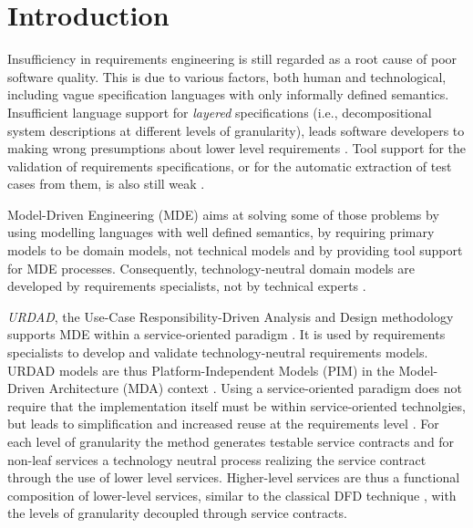 \section{Introduction}
Insufficiency in requirements engineering is still regarded as a root cause of poor software quality. This is due to various factors, both human and technological, including vague specification languages with only informally defined semantics. Insufficient language support for \emph{layered} specifications (i.e., decompositional system descriptions at different levels of granularity), leads software developers to making wrong presumptions about lower level requirements \cite{espana_evaluating_2009}. Tool support for the validation of requirements specifications, or for the automatic extraction of test cases from them, is also still weak \cite{bashardoust-tajali_extracting_2008}.

Model-Driven Engineering (MDE) \cite{schmidt_model_2006} aims at solving some of those problems by using modelling languages with well defined semantics, by requiring primary models to be domain models, not technical models \cite{asnina_computation_2010} and by providing tool support for MDE processes. Consequently, technology-neutral domain models are developed by requirements specialists, not by technical experts \cite{asnina_computation_2010}.

\emph{URDAD}, the Use-Case Responsibility-Driven Analysis and Design methodology \cite{fritz_solms_technology_2007} supports MDE within a service-oriented paradigm \cite{solms_urdad_2010}. It is used by requirements specialists to develop and validate technology-neutral requirements models. URDAD models are thus Platform-Independent Models (PIM) in the Model-Driven Architecture (MDA) context \cite{solms_urdad_2010}. Using a service-oriented paradigm does not require that the implementation itself must be within service-oriented technolgies, but leads to  simplification and increased reuse at the requirements level \cite{halpin_it_2009,cao_modeling_2008}. For each level of granularity the method generates testable service contracts and for non-leaf services a technology neutral process realizing the service contract through the use of lower level services. Higher-level services are thus a functional composition of lower-level services, similar to the classical DFD technique \cite{demarco_tom_structured_1978}, with the levels of granularity decoupled through service contracts.

